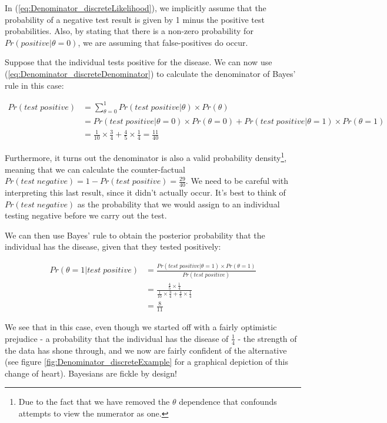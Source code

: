 \documentclass[11pt,fullpage]{book}
\begin{document}
In (\ref{eq:Denominator_discreteLikelihood}), we implicitly assume that the probability of a negative test result is given by 1 minus the positive test probabilities. Also, by stating that there is a non-zero probability for $Pr(positive|\theta=0)$, we are assuming that false-positives do occur.

Suppose that the individual tests positive for the disease. We can now use (\ref{eq:Denominator_discreteDenominator}) to calculate the denominator of Bayes' rule in this case:

\begin{equation}
\begin{align}
Pr(test\; positive) &= \sum\limits_{\theta=0}^{1} Pr(test\; positive|\theta) \times Pr(\theta)\\
&= Pr(test\; positive|\theta=0) \times Pr(\theta=0) + Pr(test\; positive|\theta=1) \times Pr(\theta=1)\\
&= \frac{1}{10} \times \frac{3}{4} + \frac{4}{5} \times \frac{1}{4} = \frac{11}{40}
\end{align}
\end{equation}

Furthermore, it turns out the denominator is also a valid probability density\footnote{Due to the fact that we have removed the $\theta$ dependence that confounds attempts to view the numerator as one.}, meaning that we can calculate the counter-factual $Pr(test\; negative) = 1 - Pr(test\; positive) = \frac{29}{40}$. We need to be careful with interpreting this last result, since it didn't actually occur. It's best to think of $Pr(test\; negative)$ as the probability that we would assign to an individual testing negative before we carry out the test.

We can then use Bayes' rule to obtain the posterior probability that the individual has the disease, given that they tested positively:

\begin{equation}\label{eq:Denominator_discreteExamplePosterior}
\begin{align}
Pr(\theta=1|test\; positive) &= \frac{Pr(test\; positive|\theta=1)\times Pr(\theta=1)}{Pr(test\; positive)}\\
&= \frac{\frac{4}{5} \times \frac{1}{4}}{\frac{1}{10} \times \frac{3}{4} + \frac{4}{5} \times \frac{1}{4}}\\
&= \frac{8}{11}
\end{align}
\end{equation}

We see that in this case, even though we started off with a fairly optimistic prejudice - a probability that the individual has the disease of $\frac{1}{4}$ - the strength of the data has shone through, and we now are fairly confident of the alternative (see figure \ref{fig:Denominator_discreteExample} for a graphical depiction of this change of heart). Bayesians are fickle by design!
\end{document}
